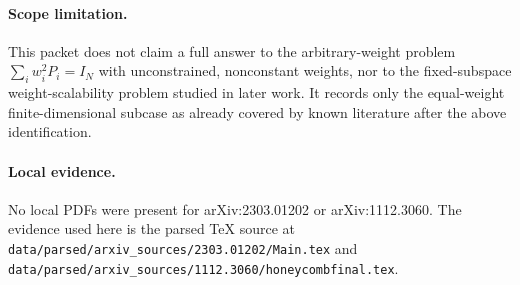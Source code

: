\documentclass[11pt]{article}
\begin{document}
\paragraph{Scope limitation.}
This packet does not claim a full answer to the arbitrary-weight problem
$\sum_i w_i^2P_i=I_N$ with unconstrained, nonconstant weights, nor to the
fixed-subspace weight-scalability problem studied in later work. It records
only the equal-weight finite-dimensional subcase as already covered by known
literature after the above identification.

\paragraph{Local evidence.}
No local PDFs were present for arXiv:2303.01202 or arXiv:1112.3060. The
evidence used here is the parsed TeX source at
\texttt{data/parsed/arxiv\_sources/2303.01202/Main.tex} and
\texttt{data/parsed/arxiv\_sources/1112.3060/honeycombfinal.tex}.
\end{document}
